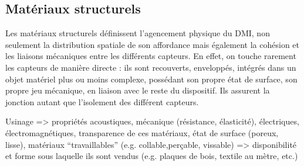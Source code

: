 \subsection{Matériaux structurels}

Les matériaux structurels définissent l'agencement physique du \gls{DMI}, non seulement la distribution spatiale de son affordance mais également la cohésion et les liaisons mécaniques entre les différents capteurs. En effet, on touche rarement les capteurs de manière directe : ils sont recouverts, enveloppés, intégrés dans un objet matériel plus ou moins complexe, possédant son propre état de surface, son propre jeu mécanique, en liaison avec le reste du dispositif.
Ils assurent la jonction autant que l'isolement des différent capteurs.

Usinage
=> propriétés acoustiques, mécanique (résistance, élasticité), électriques, électromagnétiques, transparence de	ces matériaux, état de surface (poreux, lisse), matériaux ``travaillables'' (e.g. collable,perçable, vissable)
=> disponibilité et forme sous laquelle ils sont vendus (e.g. plaques de bois, textile au mètre, etc.)

